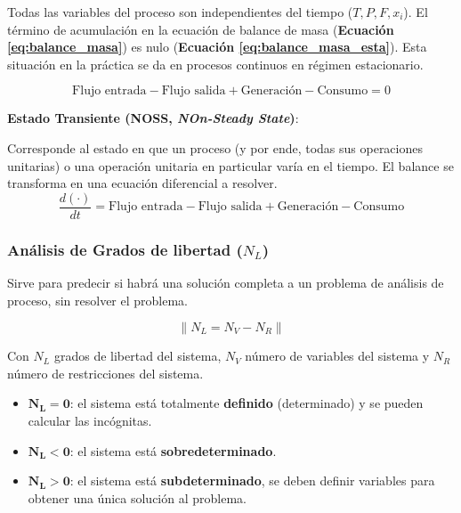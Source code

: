            Todas las variables del proceso son independientes del tiempo (\(T, P, F, x_{i}\)). El término de acumulación en la ecuación de balance de masa (\textbf{Ecuación \ref{eq:balance_masa}}) es nulo (\textbf{Ecuación \ref{eq:balance_masa_esta}}). Esta situación en la práctica se da en procesos continuos en régimen estacionario.
            
            \begin{equation}
            \label{eq:balance_masa_esta}
                \text{Flujo entrada} - \text{Flujo salida} + \text{Generación} - \text{Consumo} = 0
            \end{equation}
            
            \textbf{Estado Transiente (NOSS, \textit{NOn-Steady State})}:
            
            Corresponde al estado en que un proceso (y por ende, todas sus operaciones unitarias) o una operación unitaria en particular varía en el tiempo. El balance se transforma en una ecuación diferencial a resolver.
            \[\frac{d(\cdot)}{dt} = \text{Flujo entrada} - \text{Flujo salida} + \text{Generación} - \text{Consumo}\]
        
        \subsubsection{Análisis de Grados de libertad (\(N_{L}\))}
        
        Sirve para predecir si habrá una solución completa a un problema de análisis de proceso, sin resolver el problema.
        
        \begin{equation}
        \label{eq:grados_libertad}
            \left \| N_{L} = N_{V} - N_{R} \right \| 
        \end{equation}
        
        Con \(N_{L}\) grados de libertad del sistema, \(N_{V}\) número de variables del sistema y \(N_{R}\) número de restricciones del sistema.
        
        \begin{itemize}
            \item \(\mathbf{N_{L} = 0}\): el sistema está totalmente \textbf{definido} (determinado) y se pueden calcular las incógnitas.
            \item \(\mathbf{N_{L} < 0}\): el sistema está \textbf{sobredeterminado}.
            \item \(\mathbf{N_{L} > 0}\): el sistema está \textbf{subdeterminado}, se deben definir variables para obtener una única solución al problema.
        \end{itemize}
        
